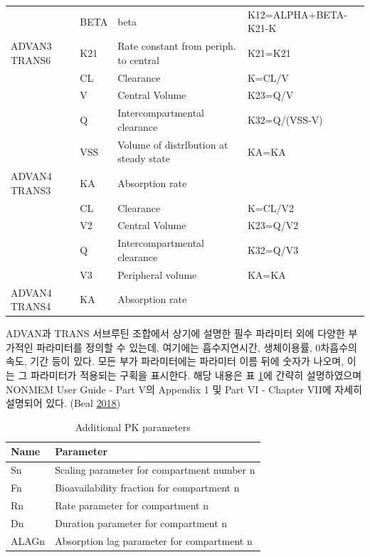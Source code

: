\documentclass[
  10pt,
  krantz2,
  a4paper]{krantz}
\theoremstyle{definition}
\theoremstyle{definition}
\theoremstyle{definition}
\theoremstyle{remark}
\begin{document}
\begin{table}
\begin{tabular}[t]{l>{\raggedright\arraybackslash}p{1.5cm}>{\raggedright\arraybackslash}p{3cm}>{\raggedright\arraybackslash}p{6cm}}
 & BETA & beta & K12=ALPHA+BETA-K21-K\\

\multirow[t]{-3}{*}{\raggedright\arraybackslash ADVAN3 TRANS6} & K21 & Rate constant from periph. to central & K21=K21\\
\cmidrule{1-4}
 & CL & Clearance & K=CL/V\\

 & V & Central Volume & K23=Q/V\\

 & Q & Intercompartmental clearance & K32=Q/(VSS-V)\\

 & VSS & Volume of distrlbution at steady state & KA=KA\\

\multirow[t]{-5}{*}{\raggedright\arraybackslash ADVAN4 TRANS3} & KA & Absorption rate & \\
\cmidrule{1-4}
 & CL & Clearance & K=CL/V2\\

 & V2 & Central Volume & K23=Q/V2\\

 & Q & Intercompartmental clearance & K32=Q/V3\\

 & V3 & Peripheral volume & KA=KA\\

\multirow[t]{-5}{*}{\raggedright\arraybackslash ADVAN4 TRANS4} & KA & Absorption rate & \\
\bottomrule
\end{tabular}
\end{table}

ADVAN과 TRANS 서브루틴 조합에서 상기에 설명한 필수 파라미터 외에 다양한 부가적인 파라미터를 정의할 수 있는데, 여기에는 흡수지연시간, 생체이용률, 0차흡수의 속도, 기간 등이 있다. 모든 부가 파라미터에는 파라미터 이름 뒤에 숫자가 나오며, 이는 그 파라미터가 적용되는 구획을 표시한다. 해당 내용은 표 \ref{tab:additional-param}에 간략히 설명하였으며 NONMEM User Guide - Part V의 Appendix 1 및 Part VI - Chapter VII에 자세히 설명되어 있다. (Beal \protect\hyperlink{ref-nonmem}{2018})

\begin{table}

\caption{\label{tab:additional-param}Additional PK parameters}
\centering
\begin{tabular}[t]{ll}
\toprule
Name & Parameter\\
\midrule
Sn & Scaling parameter for compartment number n\\
Fn & Bioavailability fraction for compartment n\\
Rn & Rate parameter for compartment n\\
Dn & Duration parameter for compartment n\\
ALAGn & Absorption lag parameter for compartment n\\
\bottomrule
\end{tabular}
\end{table}
\end{document}
